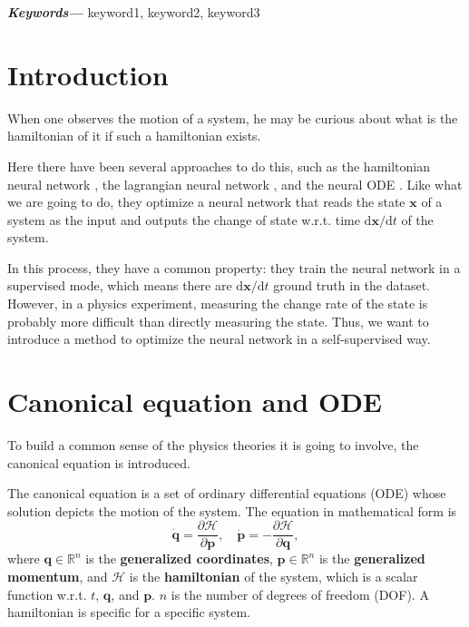 \documentclass{article}
\providecommand{\keywords}[1]
{
  \small	
  \textbf{\textit{Keywords---}} #1
}
\begin{document}
\keywords{keyword1, keyword2, keyword3}

\tableofcontents

\section{Introduction}

When one observes the motion of a system,
he may be curious about what is the hamiltonian of it
if such a hamiltonian exists.

Here there have been several approaches to do this,
such as the hamiltonian neural network \cite{greydanus2019hamiltonian},
the lagrangian neural network \cite{cranmer2020lagrangian},
and the neural ODE \cite{chen2018ode}.
Like what we are going to do,
they optimize a neural network that reads the state $\mathbf x$ of a system as the input
and outputs the change of state w.r.t. time $\mathrm d\mathbf x/\mathrm dt$ of the system.

In this process, they have a common property:
they train the neural network in a supervised mode,
which means there are $\mathrm d\mathbf x/\mathrm dt$ ground truth in the dataset.
However, in a physics experiment, measuring the change rate of the state is probably more difficult than directly measuring the state.
Thus, we want to introduce a method to optimize the neural network in a self-supervised way.

\section{Canonical equation and ODE}

To build a common sense of the physics theories it is going to involve,
the canonical equation is introduced.

The canonical equation is a set of ordinary differential equations (ODE)
whose solution depicts the motion of the system.
The equation in mathematical form is \cite{hand2008mechanics}\cite[p. 65]{arnold1989mathmech}\cite[p. 132]{landau1976mechanics}
\begin{equation}
	\dot{\mathbf q}=\frac{\partial\mathcal H}{\partial\mathbf p},
	\quad
	\dot{\mathbf p}=-\frac{\partial\mathcal H}{\partial\mathbf q},
	\label{eq:canonical}
\end{equation}
where $\mathbf q\in\mathbb R^n$ is the \textbf{generalized coordinates},
$\mathbf p\in\mathbb R^n$ is the \textbf{generalized momentum},
and $\mathcal H$ is the \textbf{hamiltonian} of the system,
which is a scalar function w.r.t. $t$, $\mathbf q$, and $\mathbf p$.
$n$ is the number of degrees of freedom (DOF).
A hamiltonian is specific for a specific system.
\end{document}
